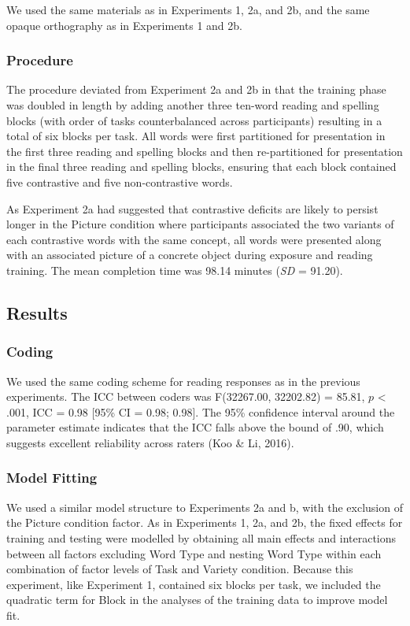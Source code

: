 \documentclass[doc,floatsintext]{apa6}
\begin{document}
We used the same materials as in Experiments 1, 2a, and 2b, and the same
opaque orthography as in Experiments 1 and 2b.

\subsubsection{Procedure}\label{procedure-3}

The procedure deviated from Experiment 2a and 2b in that the training
phase was doubled in length by adding another three ten-word reading and
spelling blocks (with order of tasks counterbalanced across
participants) resulting in a total of six blocks per task. All words
were first partitioned for presentation in the first three reading and
spelling blocks and then re-partitioned for presentation in the final
three reading and spelling blocks, ensuring that each block contained
five contrastive and five non-contrastive words.

As Experiment 2a had suggested that contrastive deficits are likely to
persist longer in the Picture condition where participants associated
the two variants of each contrastive words with the same concept, all
words were presented along with an associated picture of a concrete
object during exposure and reading training. The mean completion time
was 98.14 minutes (\emph{SD} = 91.20).

\subsection{Results}\label{results-3}

\subsubsection{Coding}\label{coding-3}

We used the same coding scheme for reading responses as in the previous
experiments. The ICC between coders was F(32267.00, 32202.82) = 85.81,
\(p\) \textless{} .001, ICC = 0.98 {[}95\% CI = 0.98; 0.98{]}. The 95\%
confidence interval around the parameter estimate indicates that the ICC
falls above the bound of .90, which suggests excellent reliability
across raters (Koo \& Li, 2016).

\subsubsection{Model Fitting}\label{model-fitting-3}

We used a similar model structure to Experiments 2a and b, with the
exclusion of the Picture condition factor. As in Experiments 1, 2a, and
2b, the fixed effects for training and testing were modelled by
obtaining all main effects and interactions between all factors
excluding Word Type and nesting Word Type within each combination of
factor levels of Task and Variety condition. Because this experiment,
like Experiment 1, contained six blocks per task, we included the
quadratic term for Block in the analyses of the training data to improve
model fit.
\end{document}
